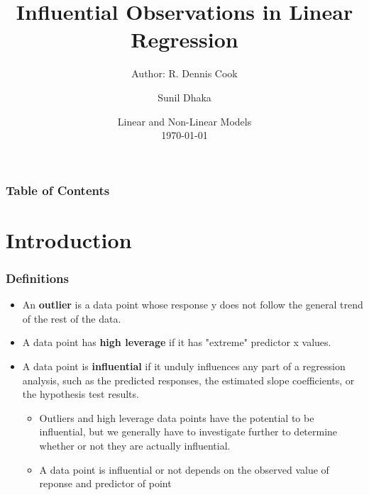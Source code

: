 \documentclass[
	11pt, %
]{beamer}
\title[MTH689A]{Influential Observations in Linear Regression} %
\subtitle{Author: R. Dennis Cook} %
\author[Sunil Dhaka]{Sunil Dhaka} %
\institute[IITK]{Indian Institute of Technology, Kanpur \\ \smallskip \textit{sunild@iitk.ac.in}} %
\date[\today]{Linear and Non-Linear Models \\ \today} %
\begin{document}
\begin{frame}
	\maketitle
\end{frame}
\begin{frame}
	\frametitle{Table of Contents}
	\tableofcontents
\end{frame}

\section{Introduction}

\begin{frame}
	\frametitle{Definitions}
	\begin{itemize}
		\item An \textbf{outlier} is a data point whose response y does not follow the general trend of the rest of the data.
		\pause
		\item A data point has \textbf{high leverage} if it has "extreme" predictor x values.
		\pause
		\item A data point is \textbf{influential} if it unduly influences any part of a regression analysis, such as the predicted responses, the
		estimated slope coefficients, or the hypothesis test results.
		\pause
		\begin{itemize}
			\item Outliers and high leverage data points have the potential to be influential, but we generally have to investigate further to determine whether or not they are actually influential.
			\item A data point is influential or not depends on the observed value of reponse and predictor of point 
		\end{itemize}
	\end{itemize}
\end{frame}
\end{document}
